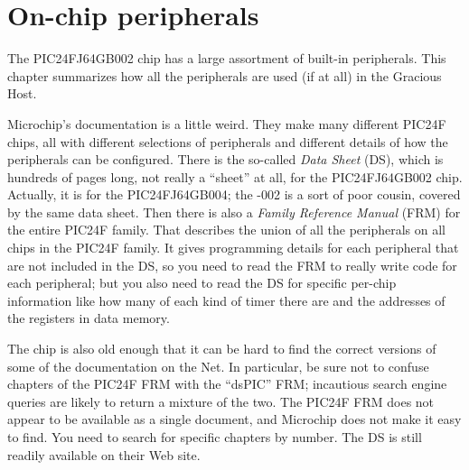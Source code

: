 
%
%
%
%
%
%

\chapter{On-chip peripherals}

The PIC24FJ64GB002 chip has a large assortment of built-in peripherals. 
This chapter summarizes how all the peripherals are used (if at all) in the
Gracious Host.

Microchip's documentation is a little weird.  They make many different
PIC24F chips, all with different selections of peripherals and different
details of how the peripherals can be configured.  There is the so-called
\emph{Data Sheet} (DS), which is hundreds of pages long, not really a
``sheet'' at all, for the PIC24FJ64GB002 chip.  Actually, it is for the
PIC24FJ64GB004; the -002 is a sort of poor cousin, covered by the same data
sheet.  Then there is also a \emph{Family Reference Manual} (FRM) for the
entire PIC24F family.  That describes the union of all the peripherals on
all chips in the PIC24F family.  It gives programming details for each
peripheral that are not included in the DS, so you need to read the FRM to
really write code for each peripheral; but you also need to read the DS for
specific per-chip information like how many of each kind of timer there are
and the addresses of the registers in data memory.

The chip is also old enough that it can be hard to find the correct versions
of some of the documentation on the Net.  In particular, be sure not to
confuse chapters of the PIC24F FRM with the ``dsPIC'' FRM; incautious search
engine queries are likely to return a mixture of the two.  The PIC24F FRM
does not appear to be available as a single document, and Microchip does not
make it easy to find.  You need to search for specific chapters by number. 
The DS is still readily available on their Web site.

